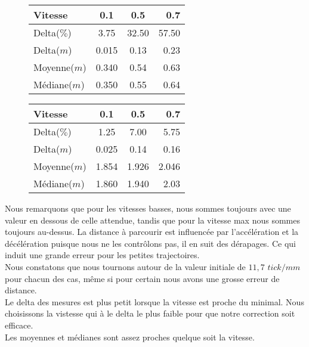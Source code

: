 \documentclass[10pt,a4paper]{article}
\begin{document}
\begin{figure}[h]
    \begin{minipage}[c]{.46\linewidth}
        \centering
        \begin{tabular}[c]{|l|c|c|r|}
 		\hline
  		Vitesse & 0.1 & 0.5 & 0.7 \\
  		\hline
  		Delta($\%$) & 3.75 & 32.50 & 57.50 \\
  		\hline
  		Delta($m$) & 0.015 & 0.13 & 0.23 \\
  		\hline
  		Moyenne($m$) & 0.340 & 0.54 & 0.63 \\
  		\hline
  		Médiane($m$) & 0.350 & 0.55 & 0.64  \\
  		\hline
		\end{tabular}
    \end{minipage}\hfill
    \begin{minipage}[c]{.46\linewidth}
        \centering
        \begin{tabular}[c]{|l|c|c|r|}
 		\hline
  		Vitesse & 0.1 & 0.5 & 0.7 \\
  		\hline
  		Delta($\%$) & 1.25 &7.00 & 5.75 \\
  		\hline
  		Delta($m$) & 0.025 & 0.14 & 0.16 \\
  		\hline
  		Moyenne($m$) & 1.854 & 1.926 & 2.046 \\
  		\hline
  		Médiane($m$) & 1.860 & 1.940 & 2.03  \\
  		\hline
		\end{tabular}
    \end{minipage}
\end{figure}

\vspace{5mm}

Nous remarquons que pour les vitesses basses, nous sommes toujours avec une valeur en dessous de celle attendue, tandis que pour la vitesse max nous sommes toujours au-dessus. La distance à parcourir est influencée par l'accélération et la décélération puisque nous ne les contrôlons pas, il en suit des dérapages. Ce qui induit une grande erreur pour les petites trajectoires.\\
Nous constatons que nous tournons autour de la valeur initiale de $11,7$ $tick/mm$ pour chacun des cas, même si pour certain nous avons une grosse erreur de distance. \\
Le delta des mesures est plus petit lorsque la vitesse est proche du minimal. Nous choisissons la vistesse qui à le delta le plus faible pour que notre correction soit efficace.\\
Les moyennes et médianes sont assez proches quelque soit la vitesse. \\
\end{document}
